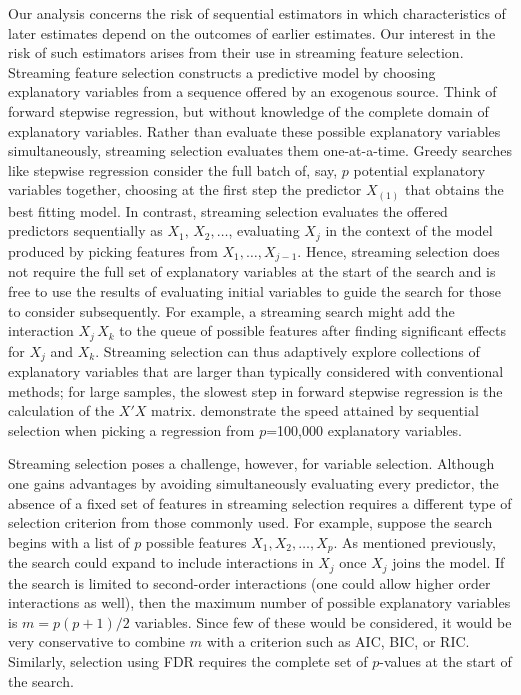 \documentclass[12pt]{article}
\begin{document}
 Our analysis concerns the risk of sequential estimators in which
 characteristics of later estimates depend on the outcomes of earlier
 estimates.  Our interest in the risk of such estimators arises from their use
 in streaming feature selection.  Streaming feature selection constructs a
 predictive model by choosing explanatory variables from a sequence offered by
 an exogenous source.  Think of forward stepwise regression, but without
 knowledge of the complete domain of explanatory variables.  Rather than evaluate
 these possible explanatory variables simultaneously, streaming selection
 evaluates them one-at-a-time.  Greedy searches like stepwise regression consider
 the full batch of, say, $p$ potential explanatory variables together, choosing
 at the first step the predictor $X_{(1)}$ that obtains the best fitting model.
  In contrast, streaming selection evaluates the offered predictors sequentially
 as $X_1, \, X_2, \ldots$, evaluating $X_j$ in the context of
 the model produced by picking features from $X_1, \ldots, X_{j-1}$.  Hence,
 streaming selection does not require the full set of explanatory variables at
 the start of the search and is free to use the results of evaluating initial
 variables to guide the search for those to consider subsequently.  For example,
 a streaming search might add the interaction $X_j \, X_k$ to the queue of
 possible features after finding significant effects for $X_j$ and $X_k$.
  Streaming selection can thus adaptively explore collections of explanatory
 variables that are larger than typically considered with conventional methods;
 for large samples, the slowest step in forward stepwise regression is the
 calculation of the $X'X$ matrix.  \citet{fosterlin11} demonstrate the speed
 attained by sequential selection when picking a regression from
 $p$=100,000 explanatory variables.


 Streaming selection poses a challenge, however, for variable selection.
  Although one gains advantages by avoiding simultaneously evaluating every
 predictor, the absence of a fixed set of features in streaming selection
 requires a different type of selection criterion from those commonly used.  For
 example, suppose the search begins with a list of $p$ possible features $X_1,
 X_2, \ldots, X_p$.  As mentioned previously, the search could expand to include
 interactions in $X_j$ once $X_j$ joins the model.  If the search is limited to
 second-order interactions (one could allow higher order interactions as well),
 then the maximum number of possible explanatory variables is $m = p(p+1)/2$
 variables.  Since few of these would be considered, it would be very
 conservative to combine $m$ with a criterion such as AIC, BIC, or RIC.
  Similarly, selection using FDR requires the complete set of $p$-values at the
 start of the search.
\end{document}
